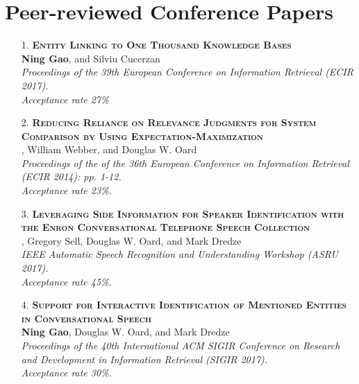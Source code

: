 \documentclass[a4paper, 11pt]{article}
\begin{document}
\section{Peer-reviewed Conference Papers}

\begin{itemize}

\item[\color{bl3} 1.]{\scshape\color{bl3}\bf Entity Linking to One Thousand Knowledge Bases}\\
{\color{black} \textbf{Ning Gao}, and Silviu Cucerzan \\
\emph{Proceedings of the 39th European Conference on Information Retrieval (ECIR 2017).\\ Acceptance rate 27\%}}
\vspace{2mm}

\item[\color{bl3} 2.]{\scshape\color{bl3}\bf Reducing Reliance on Relevance Judgments for System Comparison by Using Expectation-Maximization}\\
, William Webber, and Douglas W. Oard\\
\emph{Proceedings of the of the 36th European Conference on Information Retrieval (ECIR 2014): pp. 1-12.\\ Acceptance rate 23\%.}
\vspace{2mm}

\item[\color{bl3} 3.]{\scshape\color{bl3}\bf Leveraging Side Information for Speaker Identification with the Enron Conversational Telephone Speech Collection}\\
, Gregory Sell, Douglas W. Oard, and Mark Dredze\\
\emph{IEEE Automatic Speech Recognition and Understanding Workshop  (ASRU 2017).\\ Acceptance rate 45\%.}
\vspace{2mm}


\item[\color{bl3} 4.]{\scshape\color{bl3}\bf Support for Interactive Identification of Mentioned Entities in Conversational Speech}\\
{\color{black} \textbf{Ning Gao}, Douglas W. Oard, and Mark Dredze \\
\emph{Proceedings of the 40th International ACM SIGIR Conference on Research and Development in Information Retrieval (SIGIR 2017).\\ Acceptance rate 30\%.}}
\vspace{2mm}


\end{itemize}
\end{document}
